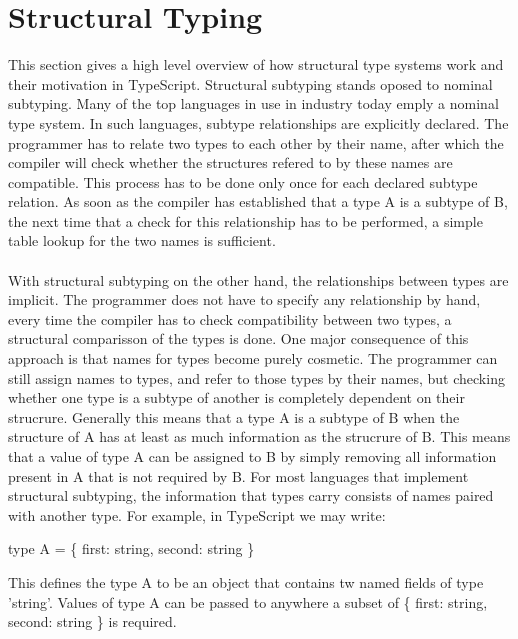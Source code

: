 \section{Structural Typing}
This section gives a high level overview of how structural type systems work and their motivation in TypeScript.
Structural subtyping stands oposed to nominal subtyping. 
Many of the top languages in use in industry today emply a nominal type system.
In such languages, subtype relationships are explicitly declared.
The programmer has to relate two types to each other by their name,
after which the compiler will check whether the structures refered to by these names are compatible.
This process has to be done only once for each declared subtype relation.
As soon as the compiler has established that a type A is a subtype of B,
the next time that a check for this relationship has to be performed, 
a simple table lookup for the two names is sufficient.
\\
\\
With structural subtyping on the other hand, the relationships between types are implicit.
The programmer does not have to specify any relationship by hand,
every time the compiler has to check compatibility between two types, a structural comparisson of the types is done.
One major consequence of this approach is that names for types become purely cosmetic.
The programmer can still assign names to types, and refer to those types by their names,
but checking whether one type is a subtype of another is completely dependent on their strucrure.
Generally this means that a type A is a subtype of B when the structure of A has at least as much information as the strucrure of B.
This means that a value of type A can be assigned to B by simply removing all information present in A that is not required by B.
For most languages that implement structural subtyping, the information that types carry consists of names paired with another type.
For example, in TypeScript we may write:

type A = \{ first: string, second: string \}

This defines the type A to be an object that contains tw named fields of type 'string'.
Values of type A can be passed to anywhere a subset of \{ first: string, second: string \} is required.
